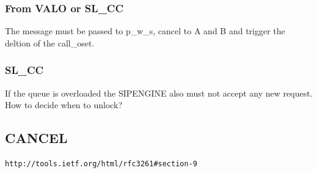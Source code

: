 \documentclass[a4paper]{report}
\begin{document}
\subsubsection{From VALO or SL\_CC}

The message must be passed to p\_w\_s, cancel to A and B and trigger the deltion of the call\_oset.

\subsubsection{SL\_CC}
If the queue is overloaded the SIPENGINE also must not accept any new request.
How to decide when to unlock?





\subsection{CANCEL}
\begin{verbatim}
http://tools.ietf.org/html/rfc3261#section-9
\end{verbatim}
\end{document}
